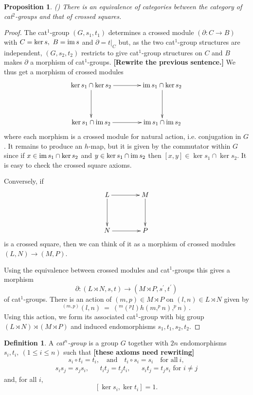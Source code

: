 \documentclass[a4paper,11pt]{article}
\theoremstyle{plain}
\newtheorem{proposition}[theorem]{Proposition}
\theoremstyle{definition}
\newtheorem{definition}[theorem]{Definition}
\begin{document}
\begin{proposition}
	\label{loday} \emph{(\cite{Loday})} 
	There is an equivalence of categories between the category of cat$^{2}$-groups 
	and that of crossed squares.
\end{proposition}
\begin{proof}
	The cat$^{1}$-group $(G,s_1,t_1)$ determines a crossed module 
	$(\partial : C \rightarrow B)$ with $C = \ker s,~ B = \mathrm{im}\, s$ and $\partial =t|_{C}$ 
	but, as the two cat$^{1}$-group structures are independent, 
	$(G,s_2,t_2)$ restricts to give cat$^{1}$-group structures on $C$ 
	and $B$ makes $\partial $ a morphism of cat$^{1}$-groups. 
	{\bf[Rewrite the previous sentence.]} 
	We thus get a morphism of crossed modules
	\[
	\xymatrix@R=40pt@C=40pt
	{ \ker s_1 \cap \ker s_2 \ar[d] \ar[r] 
		& \im s_1 \cap \ker s_2 \ar[d] \\ 
		\ker s_1 \cap \im s_2 \ar[r] 
		& \im s_1 \cap \im s_2 } 
	\]
	\noindent where each morphism is a crossed module for natural action, 
	i.e. conjugation in $G$. 
	It remains to produce an $h$-map, but it is given by the commutator within $G$ 
	since if $x \in \mathrm{im}\, s_1 \cap \ker s_2$ 
	and $y\in \ker s_1 \cap \mathrm{im}\, s_2$ then $[x,y] \in \ker s_1 \cap \ker s_2$. 
	It is easy to check the crossed square axioms.
	
	Conversely, if
	\[
	\xymatrix@R=40pt@C=40pt
	{ L \ar[d] \ar[r] 
		& M \ar[d] \\ 
		N \ar[r] 
		& P }  
	\]
	\noindent is a crossed square, 
	then we can think of it as a morphism of crossed modules $(L,N) \rightarrow (M,P)$.
	
	Using the equivalence between crossed modules and cat$^{1}$-groups this
	gives a morphism
	\[
	\partial : (L \rtimes N,s,t) \longrightarrow (M \rtimes P, s^{\prime}, t^{\prime})
	\]
	of cat$^{1}$-groups. 
	There is an action of $(m,p) \in M \rtimes P$ on $(l,n) \in L \rtimes N$ 
	given by
	\[
	^{(m,p)}(l,n) ~=~ (^{m}(^{p}l)h(m,^{p}n),^{p}n)\,.
	\] 
	Using this action, we form its associated cat$^{1}$-group with big group 
	$(L \rtimes N) \rtimes (M \rtimes P)$ 
	and induced endomorphisms $s_1,t_1,s_2,t_2$.
\end{proof}

\begin{definition}
	A \emph{cat$^{n}$-group} is a group $G$ together with $2n$ endomorphisms 
	$s_{i},t_{i},~ (1\leq i\leq n)$ such that 
	{\bf [these axioms need rewriting]} 
	\[
	s_{i} \circ t_{i} = t_{i}, \quad\text{and}\quad 
	t_{i} \circ s_{i} = s_{i} \quad\mbox{for all}~i,  
	\]
	\[
	\begin{array}{ccccc}
	s_{i}s_{j}=s_{j}s_{i}, &  & t_{i}t_{j}=t_{j}t_{i}, &  & s_{i}t_{j}=t_{j}s_{i}%
	\text{ for }i\neq j%
	\end{array}%
	\]%
	and, for all $i$,%
	\[
	\left[ \ker s_{i},\ker t_{i}\right] =1.
	\]
\end{definition}
\end{document}
